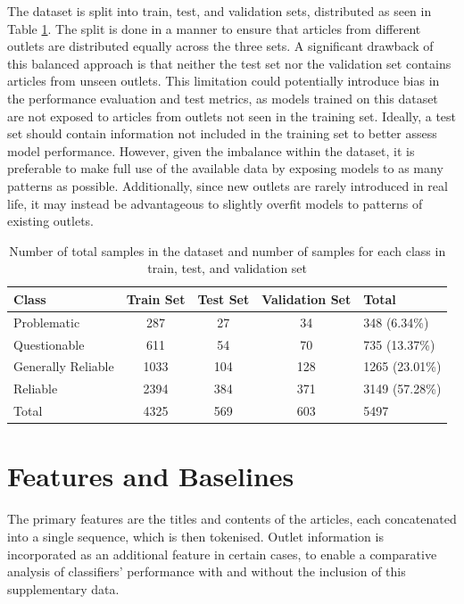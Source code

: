 The dataset is split into train, test, and validation sets, distributed as seen in Table \ref{table:dataset_split}. The split is done in a manner to ensure that articles from different outlets are distributed equally across the three sets. A significant drawback of this balanced approach is that neither the test set nor the validation set contains articles from unseen outlets. This limitation could potentially introduce bias in the performance evaluation and test metrics, as models trained on this dataset are not exposed to articles from outlets not seen in the training set. Ideally, a test set should contain information not included in the training set to better assess model performance. However, given the imbalance within the dataset, it is preferable to make full use of the available data by exposing models to as many patterns as possible. Additionally, since new outlets are rarely introduced in real life, it may instead be advantageous to slightly overfit models to patterns of existing outlets.

\begin{table}[htbp]
    \centering
    \begin{tabular}{| l | c | c | c | l |}
        \hline
        Class              & Train Set & Test Set & Validation Set & Total           \\
        \hline
        Problematic        & 287       & 27       & 34             & 348   (6.34\%)  \\
        Questionable       & 611       & 54       & 70             & 735   (13.37\%) \\
        Generally Reliable & 1033      & 104      & 128            & 1265  (23.01\%) \\
        Reliable           & 2394      & 384      & 371            & 3149  (57.28\%) \\
        \hline
        Total              & 4325      & 569      & 603            & 5497            \\
        \hline
    \end{tabular}
    \caption{Number of total samples in the dataset and number of samples for each class in train, test, and validation set}
    \label{table:dataset_split}
\end{table}


\section{Features and Baselines}

The primary features are the titles and contents of the articles, each concatenated into a single sequence, which is then tokenised.  Outlet information is incorporated as an additional feature in certain cases, to enable a comparative analysis of classifiers' performance with and without the inclusion of this supplementary data.

